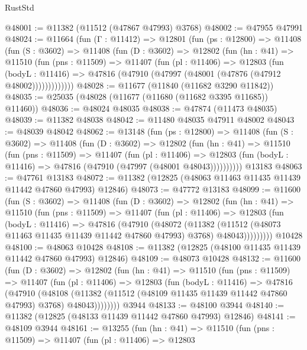 \begin{lexlean}{RustStd}
\begin{coremodule}
@48001 := @11382 (@11512 (@47867 @47993) @3768)
@48002 := @47955 @47991
@48024 := @11664
    (fun (Γ : @11412) =>
    @12801
      (fun (ps : @12800) =>
      @11408
        (fun (S : @3602) =>
        @11408
          (fun (D : @3602) =>
          @12802
            (fun (hn : @41) =>
            @11510
              (fun (pns : @11509) =>
              @11407
                (fun (pl : @11406) =>
                @12803
                  (fun (bodyL : @11416) =>
                  @47816 (@47910 (@47997 (@48001 (@47876 (@47912 @48002)))))))))))))
@48028 := @11677 (@11840 (@11682 @3290 @11842))
@48035 := @25035 (@48028 (@11677 (@11680 (@11682 @3395 @11685)) @11460))
@48036 := @48024 @48035
@48038 := @47874 (@11473 @48035)
@48039 := @11382 @48038
@48042 := @11480 @48035 @47911 @48002
@48043 := @48039 @48042
@48062 := @13148
    (fun (ps : @12800) =>
    @11408
      (fun (S : @3602) =>
      @11408
        (fun (D : @3602) =>
        @12802
          (fun (hn : @41) =>
          @11510
            (fun (pns : @11509) =>
            @11407
              (fun (pl : @11406) =>
              @12803 (fun (bodyL : @11416) => @47816 (@47910 (@47997 (@48001 @48043))))))))))
    @13183
@48063 := @47761 @13183
@48072 := @11382 (@12825 (@48063 @11463 @11435 @11439 @11442 @47860 @47993) @12846)
@48073 := @47772 @13183
@48099 := @11600
    (fun (S : @3602) =>
    @11408
      (fun (D : @3602) =>
      @12802
        (fun (hn : @41) =>
        @11510
          (fun (pns : @11509) =>
          @11407
            (fun (pl : @11406) =>
            @12803
              (fun (bodyL : @11416) =>
              @47816
                (@47910
                  (@48072
                    (@11382
                      (@11512 (@48073 @11463 @11435 @11439 @11442 @47860 @47993) @3768)
                      @48043)))))))))
    @10428
@48100 := @48063 @10428
@48108 := @11382 (@12825 (@48100 @11435 @11439 @11442 @47860 @47993) @12846)
@48109 := @48073 @10428
@48132 := @11600
    (fun (D : @3602) =>
    @12802
      (fun (hn : @41) =>
      @11510
        (fun (pns : @11509) =>
        @11407
          (fun (pl : @11406) =>
          @12803
            (fun (bodyL : @11416) =>
            @47816
              (@47910
                (@48108
                  (@11382 (@11512 (@48109 @11435 @11439 @11442 @47860 @47993) @3768) @48043))))))))
    @3944
@48133 := @48100 @3944
@48140 := @11382 (@12825 (@48133 @11439 @11442 @47860 @47993) @12846)
@48141 := @48109 @3944
@48161 := @13255
    (fun (hn : @41) =>
    @11510
      (fun (pns : @11509) =>
      @11407
        (fun (pl : @11406) =>
        @12803

\end{coremodule}
\end{lexlean}
